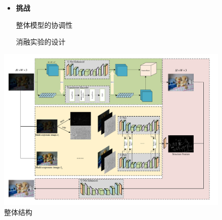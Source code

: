\documentclass[CJK,aspectratio=169]{beamer}  %
\begin{document}
\begin{frame}
\begin{figure}
\begin{minipage}{.4\columnwidth}
\begin{itemize}
					\item \textbf{挑战}
					
					{ 整体模型的协调性}
					
					{ 消融实验的设计}
				\end{itemize}
			\end{minipage}
			\begin{minipage}{.58\columnwidth}
				\setlength{\abovecaptionskip}{-0.05cm}
				\centering 
				\includegraphics[width=\textwidth]{picture/LLIE/My Architecture/Total architecture}
				\captionsetup{font=scriptsize}
				\caption{
					\label{fig: Total architecture}
					\tiny 整体结构
				}
			\end{minipage}
		\end{figure}
		
	\end{frame}
	
\end{document}
